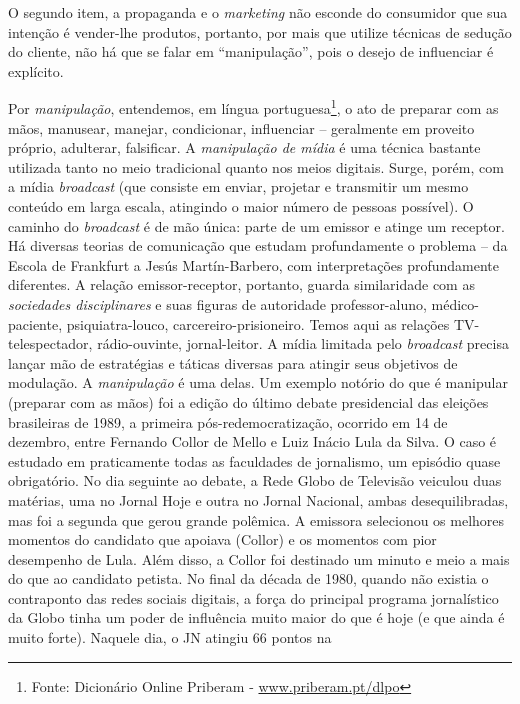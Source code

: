 O segundo item, a propaganda e o \emph{marketing} não esconde do
consumidor que sua intenção é vender-lhe produtos, portanto, por mais
que utilize técnicas de sedução do cliente, não há que se falar em
``manipulação'', pois o desejo de influenciar é explícito.

Por \emph{manipulação}, entendemos, em língua portuguesa\footnote{Fonte:
  Dicionário Online Priberam -
  \href{http://www.priberam.pt/dlpo}{www.priberam.pt/dlpo}}, o ato de
preparar com as mãos, manusear, manejar, condicionar, influenciar --
geralmente em proveito próprio, adulterar, falsificar. A
\emph{manipulação de mídia} é uma técnica bastante utilizada tanto no
meio tradicional quanto nos meios digitais. Surge, porém, com a mídia
\emph{broadcast} (que consiste em enviar, projetar e transmitir um mesmo
conteúdo em larga escala, atingindo o maior número de pessoas possível).
O caminho do \emph{broadcast} é de mão única: parte de um emissor e
atinge um receptor. Há diversas teorias de comunicação que estudam
profundamente o problema -- da Escola de Frankfurt a Jesús
Martín-Barbero, com interpretações profundamente diferentes. A relação
emissor-receptor, portanto, guarda similaridade com as \emph{sociedades
disciplinares} e suas figuras de autoridade professor-aluno,
médico-paciente, psiquiatra-louco, carcereiro-prisioneiro. Temos aqui as
relações TV-telespectador, rádio-ouvinte, jornal-leitor. A mídia
limitada pelo \emph{broadcast} precisa lançar mão de estratégias e
táticas diversas para atingir seus objetivos de modulação. A
\emph{manipulação} é uma delas. Um exemplo notório do que é manipular
(preparar com as mãos) foi a edição do último debate presidencial das
eleições brasileiras de 1989, a primeira pós-redemocratização, ocorrido
em 14 de dezembro, entre Fernando Collor de Mello e Luiz Inácio Lula da
Silva. O caso é estudado em praticamente todas as faculdades de
jornalismo, um episódio quase obrigatório. No dia seguinte ao debate, a
Rede Globo de Televisão veiculou duas matérias, uma no Jornal Hoje e
outra no Jornal Nacional, ambas desequilibradas, mas foi a segunda que
gerou grande polêmica. A emissora selecionou os melhores momentos do
candidato que apoiava (Collor) e os momentos com pior desempenho de
Lula. Além disso, a Collor foi destinado um minuto e meio a mais do que
ao candidato petista. No final da década de 1980, quando não existia o
contraponto das redes sociais digitais, a força do principal programa
jornalístico da Globo tinha um poder de influência muito maior do que é
hoje (e que ainda é muito forte). Naquele dia, o JN atingiu 66 pontos na
